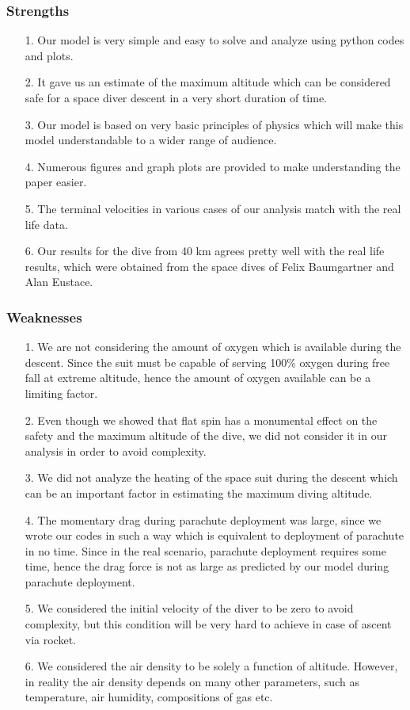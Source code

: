 \documentclass[a4paper, 14pt]{extarticle}
\begin{document}
\subsubsection{Strengths}
\begin{enumerate}
    \item[1.]Our model is very simple and easy to solve and analyze using python codes and plots.
    \item[2.] It gave us an estimate of the maximum altitude which can be considered safe for a space diver descent in a very short duration of time.
    \item[3.] Our model is based on very basic principles of physics which will make this model understandable to a wider range of audience.
    \item[4.] Numerous figures and graph plots are provided to make understanding the paper easier.
    \item[5.] The terminal velocities in various cases of our analysis match with the real life data.
    \item[6.] Our results for the dive from 40 km agrees pretty well with the real life results, which were obtained from the space dives of Felix Baumgartner and Alan Eustace.
\end{enumerate}
\subsubsection{Weaknesses}
\begin{enumerate}
    \item[1.]We are not considering the amount of oxygen which is available during the descent. Since the suit must be capable of serving 100\% oxygen during free fall at extreme altitude, hence the amount of oxygen available can be a limiting factor.
    \item[2.] Even though we showed that flat spin has a monumental effect on the safety and the maximum altitude of the dive, we did not consider it in our analysis in order to avoid complexity.
    \item[3.] We did not analyze the heating of the space suit during the descent which can be an important factor in estimating the maximum diving altitude.
    \item[4.] The momentary drag during parachute deployment was large, since we wrote our codes in such a way which is equivalent to deployment of parachute in no time. Since in the real scenario, parachute deployment requires some time, hence the drag force is not as large as predicted by our model during parachute deployment.
    \item[5.] We considered the initial velocity of the diver to be zero to avoid complexity, but this condition will be very hard to achieve in case of ascent via rocket.
    \item[6.] We considered the air density to be solely a function of altitude. However, in reality the air density depends on many other parameters, such as temperature, air humidity, compositions of gas etc.
    
\end{enumerate}
\end{document}
